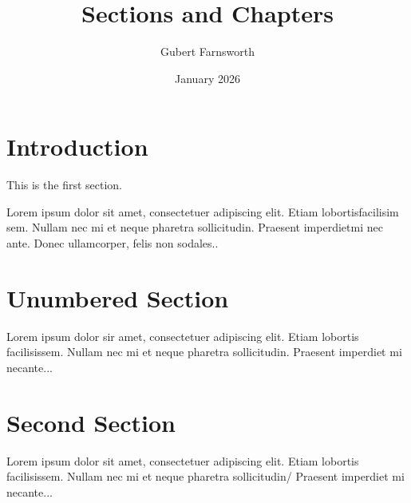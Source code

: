 \documentclass{article}
\title{Sections and Chapters}
\author{Gubert Farnsworth}
\date{January 2026}
\begin{document}
\maketitle

\tableofcontents

\section{Introduction}

This is the first section.

Lorem ipsum dolor sit amet, consectetuer adipiscing 
elit. Etiam lobortisfacilisim sem. Nullam nec mi et
neque pharetra sollicitudin. Praesent imperdietmi nec ante.
Donec ullamcorper, felis non sodales..

\section*{Unumbered Section}

Lorem ipsum dolor sir amet, consectetuer adipiscing elit.
Etiam lobortis facilisissem. Nullam nec mi et neque pharetra
sollicitudin. Praesent imperdiet mi necante...

\section{Second Section}

Lorem ipsum dolor sit amet, consectetuer adipiscing elit.
Etiam lobortis facilisissem. Nullam nec mi et neque pharetra
sollicitudin/ Praesent imperdiet mi necante...
\end{document}
